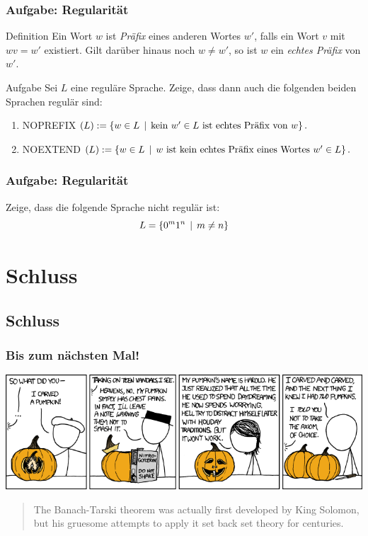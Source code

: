 \begin{frame}
\frametitle{Aufgabe: Regularität}

\begin{block}{Definition}
Ein Wort $w$ ist \emph{Präfix} eines anderen Wortes
$w'$, falls ein Wort $v$ mit $wv = w'$ existiert. Gilt darüber hinaus
noch $w\neq w'$, so ist $w$ ein \emph{echtes Präfix} von $w'$.
\end{block}

\begin{block}{Aufgabe}
Sei $L$ eine reguläre Sprache. Zeige, dass dann auch die folgenden beiden Sprachen regulär sind:
\begin{enumerate}
\item NOPREFIX$(L):=\left\lbrace w\in L \,\mid\, \mbox{kein $w'\in L$ ist echtes Präfix
    von $w$} \right\rbrace.$
\item NOEXTEND$(L):= \left\lbrace w\in L \,\mid\, \mbox{$w$ ist kein echtes Präfix eines
    Wortes $w'\in L$} \right\rbrace.$
\end{enumerate}
\end{block}
\end{frame}
\begin{frame}
 \frametitle{Aufgabe: Regularität}
 Zeige, dass die folgende Sprache nicht regulär ist:
 $$L = \left\lbrace 0^m 1^n \,\mid\, m \neq n \right\rbrace$$
\end{frame}

\section{Schluss}
\subsection{Schluss}

\begin{frame}
 \frametitle{Bis zum nächsten Mal!}
 \begin{center} \includegraphics[width=\textwidth]{images/xkcd_804.png} \end{center}
 \begin{quote}\scriptsize{The Banach-Tarski theorem was actually first developed by King Solomon, but his gruesome attempts to apply it set back set theory for centuries.}\end{quote}
\end{frame}


